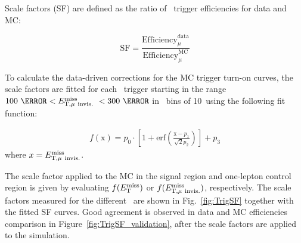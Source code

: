 \par Scale factors (SF) are defined as the ratio of \MET~trigger efficiencies for data and MC:

\begin{equation}
	\label{eq:dataMCsf}
	\text{SF} = \frac{\text{Efficiency}^{\text{data}}_{\mu}}{\text{Efficiency}^{\text{MC}}_{\mu}}
\end{equation}

To calculate the data-driven corrections for the MC trigger turn-on curves, the scale factors are fitted for each \MET~trigger starting in the range $100~\GeV < \METnomu~< 300~\GeV$ in \MET~bins of 10~\GeV using the following fit function:

\begin{eqnarray}
	\label{eq:dataMCsf_fit}
	f\left(\text{x}\right) = p_0 \cdot \left[1 + \text{erf}\left(\frac{\text{x} - p_{1}}{\sqrt{2}p_{2}}\right)\right] + p_3
\end{eqnarray}
where $x = E_{\mathrm{T, \mu~invis.}}^{\mathrm{miss}}$.

\par The scale factor applied to the MC in the signal region and one-lepton control region is given by evaluating $f(E_{\mathrm{T}}^{\mathrm{miss}})$ or $f(E_{\mathrm{T, \mu~invis.}}^{\mathrm{miss}})$, respectively. 
The scale factors measured for the different \MET~are shown in Fig.~\ref{fig:TrigSF} together with the fitted SF curves.
Good agreement is observed in data and MC efficiencies comparison in Figure~\ref{fig:TrigSF_validation}, after the scale factors are applied to the simulation.

